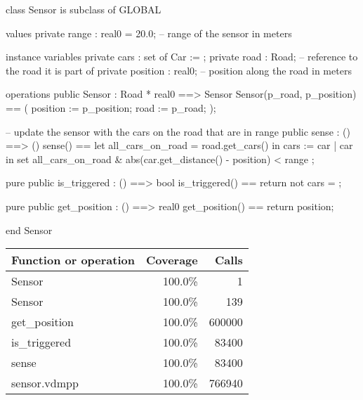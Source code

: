 \documentclass[a4paper]{article}
\begin{document}
\title{}
\author{}
\begin{vdm_al}
class Sensor is subclass of GLOBAL

values
    private range : real0 = 20.0; -- range of the sensor in meters

instance variables
    private cars : set of Car := {};
    private road : Road; -- reference to the road it is part of
    private position : real0; -- position along the road in meters

operations
    public Sensor : Road * real0 ==> Sensor
    Sensor(p_road, p_position) == (
        position := p_position;
        road := p_road;
    );

    -- update the sensor with the cars on the road that are in range
    public sense : () ==> ()
    sense() ==
        let all_cars_on_road = road.get_cars() in
            cars := {
                car
                | car in set all_cars_on_road
                & abs(car.get_distance() - position) < range
            };

    pure public is_triggered : () ==> bool
    is_triggered() == return not cars = {};

    pure public get_position : () ==> real0
    get_position() == return position;

end Sensor
\end{vdm_al}
\bigskip
\begin{longtable}{|l|r|r|}
\hline
Function or operation & Coverage & Calls \\
\hline
\hline
Sensor & 100.0\% & 1 \\
\hline
Sensor & 100.0\% & 139 \\
\hline
get\_position & 100.0\% & 600000 \\
\hline
is\_triggered & 100.0\% & 83400 \\
\hline
sense & 100.0\% & 83400 \\
\hline
\hline
sensor.vdmpp & 100.0\% & 766940 \\
\hline
\end{longtable}
\end{document}
